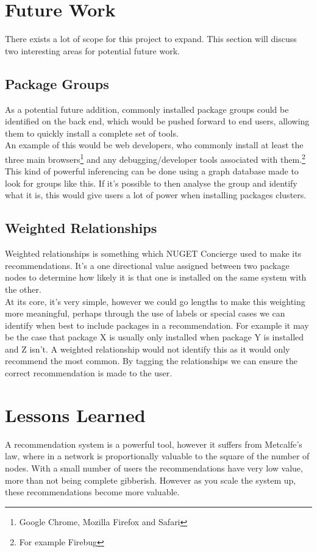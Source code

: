\documentclass{l4proj}
\begin{document}
\section{Future Work}
There exists a lot of scope for this project to expand. This section will discuss two interesting areas for potential future work.

\subsection{Package Groups}
As a potential future addition, commonly installed package groups could be identified on the back end, which would be pushed forward to end users, allowing them to quickly install a complete set of tools.\\
An example of this would be web developers, who commonly install at least the three main browsers\footnote{Google Chrome, Mozilla Firefox and Safari} and any debugging/developer tools associated with them.\footnote{For example Firebug}\\
This kind of powerful inferencing can be done using a graph database made to look for groups like this. If it's possible to then analyse the group and identify what it is, this would give users a lot of power when installing packages clusters.  

\subsection{Weighted Relationships} 
Weighted relationships is something which NUGET Concierge used to make its recommendations. It's a one directional value assigned between two package nodes to determine how likely it is that one is installed on the same system with the other.\\
At its core, it's very simple, however we could go lengths to make this weighting more meaningful, perhaps through the use of labels or special cases we can identify when best to include packages in a recommendation. For example it may be the case that package X is usually only installed when package Y is installed and Z isn't. A weighted relationship would not identify this as it would only recommend the most common. By tagging the relationships we can ensure the correct recommendation is made to the user.

\section{Lessons Learned}
A recommendation system is a powerful tool, however it suffers from Metcalfe's law, where in a network is proportionally valuable to the square of the number of nodes. With a small number of users the recommendations have very low value, more than not being complete gibberish. However as you scale the system up, these recommendations become more valuable.\\

 
 
 


\end{document}
